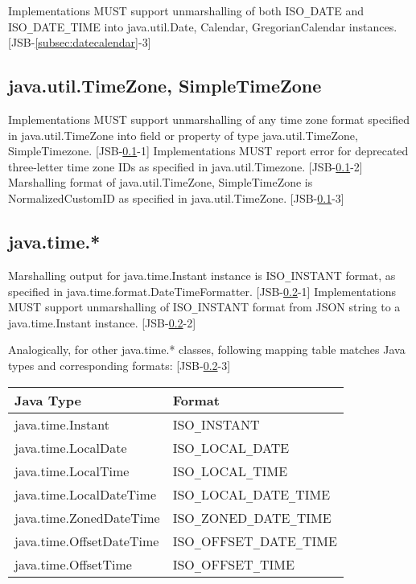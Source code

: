 Implementations MUST support unmarshalling of both ISO\verb|_|DATE and ISO\verb|_|DATE\verb|_|TIME into java.util.Date, Calendar, GregorianCalendar instances. [JSB-\ref{subsec:datecalendar}-3]

\subsection{java.util.TimeZone, SimpleTimeZone}
\label{subsec:dateTimezone}

Implementations MUST support unmarshalling of any time zone format specified in java.util.TimeZone into field or property of type java.util.TimeZone, SimpleTimezone. [JSB-\ref{subsec:dateTimezone}-1] Implementations MUST report error for deprecated three-letter time zone IDs as specified in java.util.Timezone. [JSB-\ref{subsec:dateTimezone}-2]
Marshalling format of java.util.TimeZone, SimpleTimeZone is NormalizedCustomID as specified in java.util.TimeZone. [JSB-\ref{subsec:dateTimezone}-3]

\subsection{java.time.*}
\label{subsec:time}

Marshalling output for java.time.Instant instance is ISO\verb|_|INSTANT format, as specified in java.time.format.DateTimeFormatter. [JSB-\ref{subsec:time}-1]
Implementations MUST support unmarshalling of ISO\verb|_|INSTANT format from JSON string to a java.time.Instant instance. [JSB-\ref{subsec:time}-2]

Analogically, for other java.time.* classes, following mapping table matches Java types and corresponding formats: [JSB-\ref{subsec:time}-3]

\begin{tabularx}{\textwidth}{ |X|X| }
\hline
Java Type & Format \\ 
\hline
java.time.Instant & ISO\verb|_|INSTANT\\
java.time.LocalDate & ISO\verb|_|LOCAL\verb|_|DATE\\
java.time.LocalTime & ISO\verb|_|LOCAL\verb|_|TIME\\
java.time.LocalDateTime & ISO\verb|_|LOCAL\verb|_|DATE\verb|_|TIME\\
java.time.ZonedDateTime & ISO\verb|_|ZONED\verb|_|DATE\verb|_|TIME\\
java.time.OffsetDateTime & ISO\verb|_|OFFSET\verb|_|DATE\verb|_|TIME\\
java.time.OffsetTime & ISO\verb|_|OFFSET\verb|_|TIME\\
\hline
\end{tabularx}


